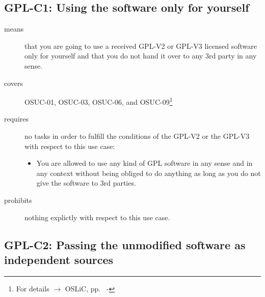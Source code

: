 \subsection{GPL-C1: Using the software only for yourself}
\label{OSUC-01-GPL} \label{OSUC-03-GPL}
\label{OSUC-06-GPL} \label{OSUC-09-GPL}

\begin{description}

\item[means] that you are going to use a received GPL-V2 or GPL-V3 licensed
software only for yourself and that you do not hand it over to any 3rd party in
any sense.

\item[covers] OSUC-01, OSUC-03, OSUC-06, and OSUC-09\footnote{For details
$\rightarrow$ OSLiC, pp.\ \pageref{OSUC-01-DEF} - \pageref{OSUC-09-DEF}}

\item[requires] no tasks in order to fulfill the conditions of the GPL-V2 or
the GPL-V3 with respect to this use case:
  \begin{itemize}
    \item You are allowed to use any kind of GPL software in any sense and in
    any context without being obliged to do anything as long as you do not
    give the software to 3rd parties.
  \end{itemize}

\item[prohibits] nothing explictly with respect to this use case.
\end{description}


\subsection{GPL-C2: Passing the unmodified software as independent sources}
\label{OSUC-02S-GPL} \label{OSUC-05S-GPL}

